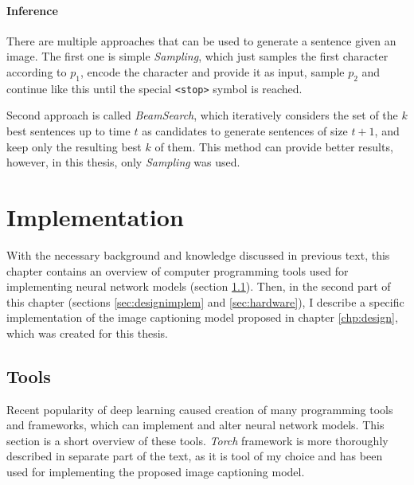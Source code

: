 \subsubsection{Inference}

There are multiple approaches that can be used to generate a sentence given an image. The first one is simple \emph{Sampling}, which just samples the first character according to $ p_1 $, encode the character and provide it as input, sample $ p_2 $ and continue like this until the special \texttt{<stop>} symbol is reached.

Second approach is called \emph{BeamSearch}, which iteratively considers the set of the $ k $ best sentences up to time $ t $ as candidates to generate sentences of size $ t + 1 $, and keep only the resulting best $ k $ of them. This method can provide better results, however, in this thesis, only \emph{Sampling} was used.

\chapter{Implementation}\label{chp:implementation}

With the necessary background and knowledge discussed in previous text, this chapter contains an overview of computer programming tools used for implementing neural network models (section \ref{sec:tools}). Then, in the second part of this chapter (sections \ref{sec:designimplem} and \ref{sec:hardware}), I describe a specific implementation of the image captioning model proposed in chapter \ref{chp:design}, which was created for this thesis.

\section{Tools}\label{sec:tools}

Recent popularity of deep learning caused creation of many programming tools and frameworks, which can implement and alter neural network models. This section is a short overview of these tools. \emph{Torch} framework is more thoroughly described in separate part of the text, as it is tool of my choice and has been used for implementing the proposed image captioning model.

